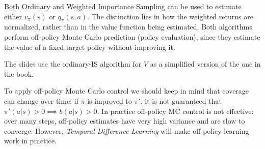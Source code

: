 Both Ordinary and Weighted Importance Sampling can be used to estimate either $v_\pi(s)$ or $q_\pi(s,a)$. The distinction lies in how the weighted returns are normalized, rather than in the value function being estimated. Both algorithms perform off-policy Monte Carlo prediction (policy evaluation), since they estimate the value of a fixed target policy without improving it.

The slides use the ordinary-IS algorithm for $V$ as a simplified version of the one in the book.

To apply off-policy Monte Carlo control we should keep in mind that coverage can change over time: if $\pi$ is improved to $\pi'$, it is not guaranteed that $\pi'(a|s)>0\implies b(a|s)>0$. In practice off-policy MC control is not effective: over many steps, off-policy estimates have very high variance and are slow to converge. However, \textit{Temporal Difference Learning} will make off-policy learning work in practice.
